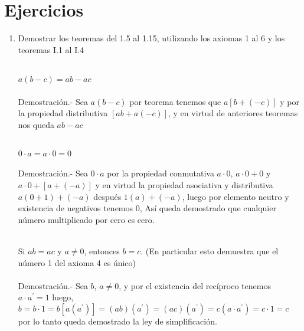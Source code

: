 \section{Ejercicios}
\begin{enumerate}

\item Demostrar los teoremas del 1.5 al 1.15, utilizando los axiomas 1 al 6 y los teoremas I.1 al I.4\\\\

\begin{teo}
$a(b-c)=ab-ac$\\\\
Demostración.- \; Sea $a(b-c)$ por teorema tenemos que $a\left[ b+(-c)\right]$  y por la propiedad distributiva $\left[ ab + a(-c) \right]$, y en virtud de anteriores teoremas nos queda $ ab - ac $ \\\\
\end{teo}

\begin{teo}
$0\cdot a = a\cdot 0 =0$\\\\
Demostración.- \;
Sea $0\cdot a$ por la propiedad conmutativa $a\cdot 0$, $a\cdot 0 + 0$ y $a\cdot 0 + \left[a+(-a) \right]$ y en virtud la propiedad asociativa y distributiva $a(0 + 1)+(-a)$ después $1(a)+(-a)$, luego por elemento neutro y existencia de negativos tenemos $0$, Así queda demostrado que cualquier número multiplicado por cero es cero.\\\\ 
\end{teo}

\begin{teo} Si $ab=ac$ y $a \neq 0$, entonces $b=c$. (En particular esto demuestra que el número 1 del axioma 4 es único)\\\\
Demostración.- \;
Sea $b$, $a\neq 0$, y por el existencia del recíproco tenemos $a\cdot a^{'}=1 $  luego,  $b=b\cdot 1=b\left[a(a^{'})\right]=(ab)(a^{'})=(ac)(a^{'})=c(a\cdot a^{'})=c\cdot 1=c$ por lo tanto queda demostrado la ley de simplificación.\\\\
\end{teo}


\end{enumerate}
